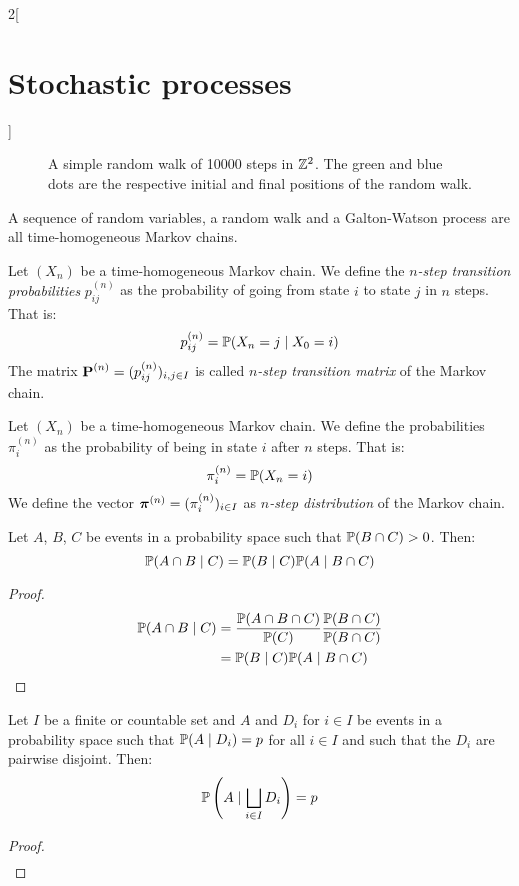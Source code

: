 \documentclass[../../../main_math.tex]{subfiles}
\begin{document}
\begin{multicols}{2}[\section{Stochastic processes}]
\begin{figure}[H]
    \caption{A simple random walk of 10000 steps in $\mathbb{Z}^2$. The green and blue dots are the respective initial and final positions of the random walk.}
    \label{fig:simple_random_walk}
  \end{figure}
  \begin{lemma}
    A sequence of \iid random variables, a random walk and a Galton-Watson process are all time-homogeneous Markov chains.
  \end{lemma}
  \begin{definition}
    Let $(X_n)$ be a time-homogeneous Markov chain. We define the \emph{$n$-step transition probabilities} $p_{ij}^{(n)}$ as the probability of going from state $i$ to state $j$ in $n$ steps. That is: $$p_{ij}^{(n)}=\mathbb{P}(X_{n}=j\mid X_0=i)$$ The matrix $\boldsymbol{\mathrm{P}}^{(n)}=(p_{ij}^{(n)})_{i,j\in I}$ is called \emph{$n$-step transition matrix} of the Markov chain.
  \end{definition}
  \begin{definition}
    Let $(X_n)$ be a time-homogeneous Markov chain. We define the probabilities $\pi_i^{(n)}$ as the probability of being in state $i$ after $n$ steps. That is: $$\pi_i^{(n)}=\mathbb{P}(X_n=i)$$
    We define the vector $\boldsymbol{\mathrm{\pi}}^{(n)}=(\pi_i^{(n)})_{i\in I}$ as \emph{$n$-step distribution} of the Markov chain.
  \end{definition}
  \begin{lemma}\label{SP:lema1Markov}
    Let $A$, $B$, $C$ be events in a probability space such that $\mathbb{P}(B\cap C)>0$. Then:
    $$\mathbb{P}(A\cap B\mid C)=\mathbb{P}(B\mid C)\mathbb{P}(A\mid B\cap C)$$
  \end{lemma}
  \begin{proof}
    \begin{align*}
      \mathbb{P}(A\cap B\mid C) & =\frac{\mathbb{P}(A\cap B\cap C)}{\mathbb{P}(C)}\frac{\mathbb{P}(B\cap C)}{\mathbb{P}(B\cap C)} \\
                           & =\mathbb{P}(B\mid C)\mathbb{P}(A\mid B\cap C)
    \end{align*}
  \end{proof}
  \begin{lemma}\label{SP:lema2Markov}
    Let $I$ be a finite or countable set and $A$ and $D_i$ for $i\in I$ be events in a probability space such that $\mathbb{P}(A\mid D_i)=p$ for all $i\in I$ and such that the $D_i$ are pairwise disjoint. Then:
    $$\mathbb{P}\left(A\mid \bigsqcup_{i\in I}D_i\right)=p$$
  \end{lemma}
  \begin{proof}
    \begin{align*}

\end{align*}
\end{proof}
\end{multicols}
\end{document}
